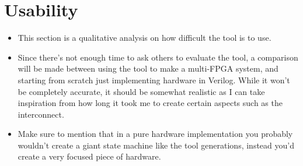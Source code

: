 \section{Usability}

\begin{itemize}
    \item This section is a qualitative analysis on how difficult the tool is to use. 
    \item Since there's not enough time to ask others to evaluate the tool, a comparison will be made between using the tool to make a multi-FPGA system, and starting from scratch just implementing hardware in Verilog. While it won't be completely accurate, it should be somewhat realistic as I can take inspiration from how long it took me to create certain aspects such as the interconnect.
    \item Make sure to mention that in a pure hardware implementation you probably wouldn't create a giant state machine like the tool generations, instead you'd create a very focused piece of hardware.
\end{itemize}